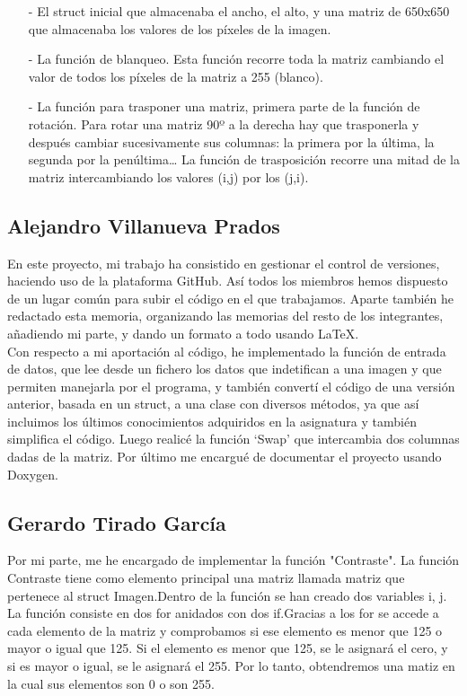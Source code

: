 \documentclass[a4paper, 11pt, spanish]{article}
\begin{document}
\begin{itemize}

\item[-] El struct inicial que almacenaba el ancho, el alto, y una matriz de 650x650 que almacenaba los valores de los píxeles de la imagen.

\item[-] La función de blanqueo. Esta función recorre toda la matriz cambiando el valor de todos los píxeles de la matriz a 255 (blanco).

\item[-] La función para trasponer una matriz, primera parte de la función de rotación. Para rotar una matriz 90º a la derecha hay que trasponerla y después cambiar sucesivamente sus columnas: la primera por la última, la segunda por la penúltima… La función de trasposición recorre una mitad de la matriz intercambiando los valores (i,j) por los (j,i).

\end{itemize}


\subsection{Alejandro Villanueva Prados}

En este proyecto, mi trabajo ha consistido en gestionar el control de versiones, haciendo uso de la plataforma GitHub. Así todos los miembros hemos dispuesto de un lugar común para subir el código en el que trabajamos. Aparte también he redactado esta memoria, organizando las memorias del resto de los integrantes, añadiendo mi parte, y dando un formato a todo usando \LaTeX.
\\

Con respecto a mi aportación al código, he implementado la función de entrada de datos, que lee desde un fichero los datos que indetifican a una imagen y que permiten manejarla por el programa, y también convertí el código de una versión anterior, basada en un struct, a una clase con diversos métodos, ya que así incluimos los últimos conocimientos adquiridos en la asignatura y también simplifica el código. Luego realicé la función `Swap' que intercambia dos columnas dadas de la matriz. Por último me encargué de documentar el proyecto usando Doxygen.


\subsection{Gerardo Tirado García}
Por mi parte, me he encargado de implementar la función  "Contraste". La función Contraste tiene como elemento principal una matriz llamada matriz que pertenece al struct Imagen.Dentro de la función se han creado dos variables i, j. La función consiste en dos for anidados con dos if.Gracias a los for se accede a cada elemento de la matriz y comprobamos si ese elemento es menor que 125 o mayor o igual que 125. Si el elemento es menor que 125, se le asignará el cero, y si es mayor o igual, se le asignará el 255. Por lo tanto, obtendremos una matiz en la cual sus elementos son 0 o son 255.
\end{document}
